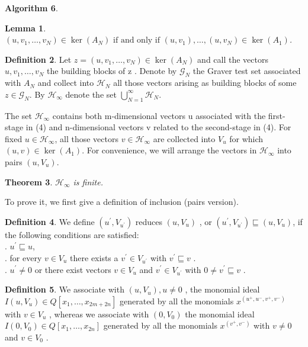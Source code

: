 \documentclass{article}
\theoremstyle{plain}
\newtheorem{theorem}{Theorem}[section]
\newtheorem{lemma}[theorem]{Lemma}
\theoremstyle{definition}
\newtheorem{definition}[theorem]{Definition}
\newtheorem{algorithm}[theorem]{Algorithm}
\begin{document}
\begin{algorithm}
\begin{lemma}$\left(u, v_{1}, \ldots, v_{N}\right) \in \operatorname{ker}\left(A_{N}\right) \text { if and only if }\left(u, v_{1}\right), \ldots,\left(u, v_{N}\right) \in \operatorname{ker}\left(A_{1}\right)$.
\end{lemma}

\begin{definition} Let $ z=\left(u, v_{1}, \ldots, v_{N}\right) \in \operatorname{ker}\left(A_{N}\right)$  and call the vectors  $u, v_{1}, \ldots, v_{N}$  the building blocks of  z . Denote by  $\mathcal{G}_{N}$  the Graver test set associated with  $A_{N} $ and collect into  $\mathcal{H}_{N}$  all those vectors arising as building blocks of some  $z \in \mathcal{G}_{N}$. By  $\mathcal{H}_{\infty}$  denote the set  $\bigcup_{N=1}^{\infty} \mathcal{H}_{N}$.
\end{definition}

The set  $\mathcal{H}_{\infty}$ contains both  m-dimensional vectors  u  associated with the first-stage in (4) and  n-dimensional vectors  v  related to the second-stage in (4). For fixed $u\in  \mathcal{H}_{\infty}$, all those vectors $v\in  \mathcal{H}_{\infty}$ are collected into $V_u$ for which $(u,v) \in
\operatorname{ker}(A_1)$. For convenience, we will arrange the vectors in  $\mathcal{H}_{\infty}$  into pairs  $\left(u, V_{u}\right) $. \\

\begin{theorem}$\mathcal{H}_{\infty}$ is finite. 
\end{theorem}

To prove it, we first give a definition of inclusion (pairs version).

\begin{definition}We define  $\left(u^{\prime}, V_{u^{\prime}}\right) $ reduces  $\left(u, V_{u}\right)$ , or  $\left(u^{\prime}, V_{u^{\prime}}\right) \sqsubseteq\left(u, V_{u}\right) $, if the following conditions are satisfied: \\
. $u^{\prime} \sqsubseteq u$, \\
. for every  $v \in V_{u}$  there exists a  $v^{\prime} \in V_{u^{\prime}}$  with  $v^{\prime} \sqsubseteq v$ .\\
. $ u^{\prime} \neq 0$  or there exist vectors  $v \in V_{u}$  and $ v^{\prime} \in V_{u^{\prime}}$  with  $0 \neq v^{\prime} \sqsubseteq v$ .
\end{definition}

\begin{definition} We associate with $ \left(u, V_{u}\right), u \neq 0$ , the monomial ideal  $I\left(u, V_{u}\right) \in Q\left[x_{1}, \ldots, x_{2 m+2 n}\right]$  generated by all the monomials  $x^{\left(u^{+}, u^{-}, v^{+}, v^{-}\right)}$ with  $v \in V_{u}$ , whereas we associate with  $\left(0, V_{0}\right)$  the monomial ideal $ I\left(0, V_{0}\right) \in Q\left[x_{1}, \ldots, x_{2 n}\right]$  generated by all the monomials  $x^{\left(v^{+}, v^{-}\right)}$ with $ v \neq 0$  and  $v \in V_{0}$ .
\end{definition}


\end{algorithm}
\end{document}
